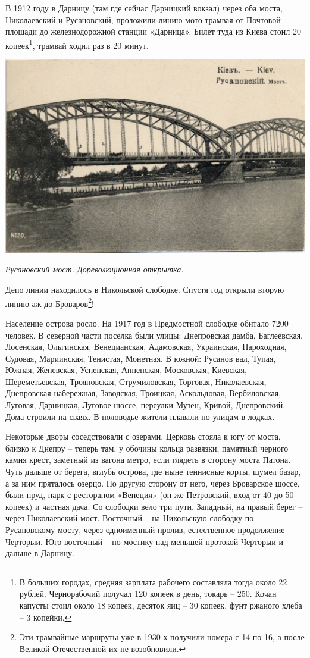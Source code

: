 В 1912 году в Дарницу (там где сейчас Дарницкий вокзал) через оба моста, Николаевский и Русановский, проложили линию мото-трамвая от Почтовой площади до железнодорожной станции «Дарница». Билет туда из Киева стоил 20 копеек\footnote{В больших городах, средняя зарплата рабочего составляла тогда около 22 рублей. Чернорабочий получал 120 копеек в день, токарь – 250. Кочан капусты стоил около 18 копеек, десяток яиц – 30 копеек, фунт ржаного хлеба – 3 копейки.}, трамвай ходил раз в 20 минут.

\begin{center}
\includegraphics[width=\linewidth]{chast-gorodki/cherto/s_rusmost.jpg}

\textit{Русановский мост. Дореволюционная открытка.}
\end{center}

Депо линии находилось в Никольской слободке. Спустя год открыли вторую линию аж до Броваров\footnote{Эти трамвайные маршруты уже в 1930-х получили номера с 14 по 16, а после Великой Отечественной их не возобновили.}!

Население острова росло. На 1917 год в Предмостной слободке обитало 7200 человек. В северной части поселка были улицы: Днепровская дамба, Баглеевская, Лосенская, Ольгинская, Венецианская, Адамовская, Украинская, Пароходная, Судовая, Мариинская, Тенистая, Монетная. В южной: Русанов вал, Тупая, Южная, Женевская, Успенская, Анненская, Московская, Киевская, Шереметьевская, Трояновская, Струмиловская, Торговая, Николаевская, Днепровская набережная, Заводская, Троицкая, Аскольдовая, Вербиловская, Луговая, Дарницкая, Луговое шоссе, переулки Музен, Кривой, Днепровский. Дома строили на сваях. В половодье жители плавали по улицам в лодках.

Некоторые дворы соседствовали с озерами. Церковь стояла к югу от моста, близко к Днепру – теперь там, у обочины кольца развязки, памятный черного камня крест, заметный из вагона метро, если глядеть в сторону моста Патона. Чуть дальше от берега, вглубь острова, где ныне теннисные корты, шумел базар, а за ним пряталось озерцо. По другую сторону от него, через Броварское шоссе, были пруд, парк с рестораном «Венеция» (он же Петровский, вход от 40 до 50 копеек) и частная дача. Со слободки вело три пути. Западный, на правый берег – через Николаевский мост. Восточный – на Никольскую слободку по Русановскому мосту, через одноименный пролив, естественное продолжение Черторыи. Юго-восточный – по мостику над меньшей протокой Черторыи и дальше в Дарницу.

